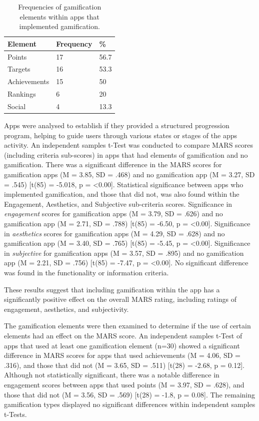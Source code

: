 \begin{table}[h]
\centering
\caption{Frequencies of gamification elements within apps that implemented gamification.}
\label{tbl: gamification-frequency}
\begin{tabular}{@{}lll@{}}
\toprule
Element & Frequency & \% \\ \midrule
Points               & 17        & 56.7     \\
Targets              & 16        & 53.3     \\
Achievements         & 15        & 50      \\
Rankings             & 6         & 20       \\
Social               & 4         & 13.3         \\ \bottomrule
\end{tabular}
\end{table}

Apps were analysed to establish if they provided a structured progression program, helping to guide users through various states or stages of the apps activity. An independent samples t-Test was conducted to compare MARS scores (including criteria sub-scores) in apps that had elements of gamification and no gamification. There was a significant difference in the MARS scores for gamification apps (M = 3.85, SD = .468) and no gamification app (M = 3.27, SD = .545) [t(85) = -5.018, p = \textless0.00]. Statistical significance between apps who implemented gamification, and those that did not, was also found within the Engagement, Aesthetics, and Subjective sub-criteria scores.
Significance in \textit{engagement} scores for gamification apps (M = 3.79, SD = .626) and no gamification app (M = 2.71, SD = .788) [t(85) = -6.50, p = \textless0.00]. Significance in \textit{aesthetics} scores for gamification apps (M = 4.29, SD = .628) and no gamification app (M = 3.40, SD = .765) [t(85) = -5.45, p = \textless0.00]. Significance in \textit{subjective} for gamification apps (M = 3.57, SD = .895) and no gamification app (M = 2.21, SD = .756) [t(85) = -7.47, p = \textless0.00]. No significant difference was found in the functionality or information criteria.

These results suggest that including gamification within the app has a significantly positive effect on the overall MARS rating, including ratings of engagement, aesthetics, and subjectivity.

The gamification elements were then examined to determine if the use of certain elements had an effect on the MARS score. An independent samples t-Test of apps that used at least one gamification element (n=30) showed a significant difference in MARS scores for apps that used achievements (M = 4.06, SD = .316), and those that did not (M = 3.65, SD = .511) [t(28) = -2.68, p = 0.12]. Although not statistically significant, there was a notable difference in engagement scores between apps that used points (M = 3.97, SD = .628), and those that did not (M = 3.56, SD = .569) [t(28) = -1.8, p = 0.08]. The remaining gamification types displayed no significant differences within independent samples t-Tests.

